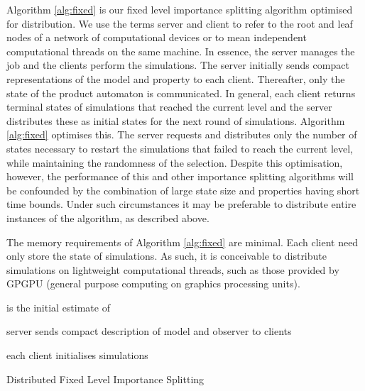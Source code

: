 \documentclass{llncs}
\begin{document}
Algorithm \ref{alg:fixed} is our fixed level importance splitting
algorithm optimised for distribution. We use the terms server and
client to refer to the root and leaf nodes of a network of computational
devices or to mean independent computational threads on the same machine.
In essence, the server manages the job and the clients perform the
simulations. The server initially sends compact representations of
the model and property to each client. Thereafter, only the state
of the product automaton is communicated. In general, each client
returns terminal states of simulations that reached the current level
and the server distributes these as initial states for the next round
of simulations. Algorithm \ref{alg:fixed} optimises this. The server
requests and distributes only the number of states necessary to restart
the simulations that failed to reach the current level, while maintaining
the randomness of the selection. Despite this optimisation, however,
the performance of this and other importance splitting algorithms
will be confounded by the combination of large state size and properties
having short time bounds. Under such circumstances it may be preferable
to distribute entire instances of the algorithm, as described above. 

The memory requirements of Algorithm \ref{alg:fixed} are minimal.
Each client need only store the state of  simulations. As such,
it is conceivable to distribute simulations on lightweight computational
threads, such as those provided by GPGPU (general purpose computing
on graphics processing units).

\begin{algorithm}

 is the initial estimate of 

server sends compact description of model and observer to  clients

each client initialises  simulations

\KwOut{}

\protect\caption{Distributed Fixed Level Importance Splitting\label{alg:fixed}}
\end{algorithm}
\end{document}
